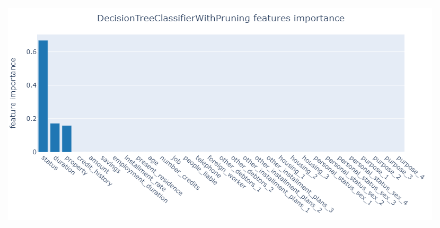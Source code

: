 \documentclass[letterpaper]{article}
\begin{document}
	\begin{figure}[!h]
		\centering
		\includegraphics[width=.9\textwidth]{images/DecisionTreeClassifierWithPruning_features_importance.png}
		\setlength{\abovecaptionskip}{-5pt}
		\label{fig:33}
	\end{figure}
\end{document}
